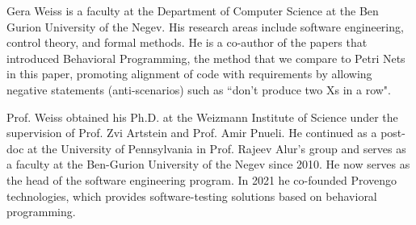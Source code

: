 \documentclass[10pt,journal,compsoc]{IEEEtran}
\theoremstyle{definition}
\begin{document}
\vfill

\newpage

\begin{IEEEbiography}{Gera Weiss} is a faculty at the Department of Computer Science at the Ben Gurion University of the Negev. His research areas include software engineering, control theory, and formal methods. He is a co-author of the papers that introduced Behavioral Programming, the method that we compare to Petri Nets in this paper, promoting alignment of code with requirements by allowing negative statements (anti-scenarios) such  as ``don't produce two Xs in a row".

Prof. Weiss obtained his Ph.D. at the Weizmann Institute of Science under the supervision of Prof. Zvi Artstein and Prof. Amir Pnueli. He continued as a post-doc at the University of Pennsylvania in Prof. Rajeev Alur's group and serves as a faculty at the Ben-Gurion University of the Negev since 2010. He now serves as the head of the software engineering program. In 2021 he co-founded Provengo technologies, which provides software-testing solutions based on behavioral programming.
\end{IEEEbiography}


\end{document}
